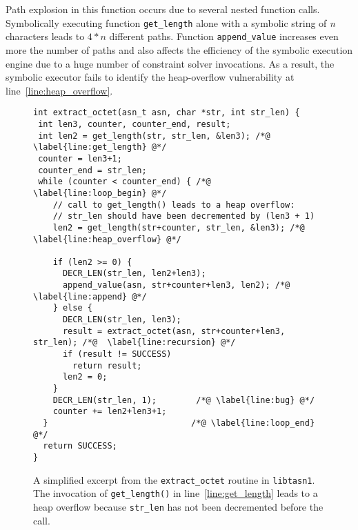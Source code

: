 Path explosion in this function occurs due to several nested function
calls. Symbolically executing function \texttt{get\_length} alone with
a symbolic string of \textit{n} characters leads to $4*n$ different
paths. Function \texttt{append\_value} increases even more the number
of paths and also affects the efficiency of the symbolic execution
engine due to a huge number of constraint solver invocations. As a
result, the symbolic executor fails to identify the heap-overflow
vulnerability at line~\ref{line:heap_overflow}.

\begin{figure}[tbp]
\begin{lstlisting}[linewidth=.99\columnwidth]
int extract_octet(asn_t asn, char *str, int str_len) {
 int len3, counter, counter_end, result;
 int len2 = get_length(str, str_len, &len3); /*@ \label{line:get_length} @*/
 counter = len3+1;
 counter_end = str_len;
 while (counter < counter_end) { /*@ \label{line:loop_begin} @*/
    // call to get_length() leads to a heap overflow:
    // str_len should have been decremented by (len3 + 1)
    len2 = get_length(str+counter, str_len, &len3); /*@ \label{line:heap_overflow} @*/

    if (len2 >= 0) {
      DECR_LEN(str_len, len2+len3);
      append_value(asn, str+counter+len3, len2); /*@ \label{line:append} @*/
    } else {
      DECR_LEN(str_len, len3);
      result = extract_octet(asn, str+counter+len3, str_len); /*@  \label{line:recursion} @*/
      if (result != SUCCESS)
        return result;
      len2 = 0;
    }
    DECR_LEN(str_len, 1);        /*@ \label{line:bug} @*/
    counter += len2+len3+1;
  }                             /*@ \label{line:loop_end} @*/
  return SUCCESS;
}
\end{lstlisting}\vspace{-3mm}
\caption{A simplified excerpt from the \texttt{extract\_octet} routine
  in \texttt{libtasn1}. The invocation of \texttt{get\_length()} in
  line~\ref{line:get_length} leads to a heap overflow because
  \texttt{str\_len} has not been decremented before the call.}
\label{fig:intro-example}\vspace{-5mm}
\end{figure}

